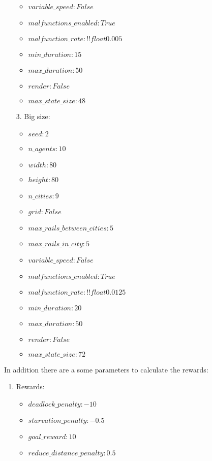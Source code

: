 \begin{enumerate}
\begin{itemize}
		\item  $variable\_speed: False $
		\item $malfunctions\_enabled: True $ 
		\item $malfunction\_rate: !!float 0.005 $
		\item $min\_duration: 15 $
		\item $max\_duration: 50 $
		\item $render: False$
		\item $max\_state\_size: 48$
	\end{itemize}
	\item [3.] Big size:
		\begin{itemize}
		\item $seed: 2$
		\item $n\_agents: 10 $
		\item $width: 80 $
		\item $height: 80 $
		\item $n\_cities: 9 $
		\item $grid: False $
		\item $max\_rails\_between\_cities: 5 $
		\item $max\_rails\_in\_city: 5 $
		\item  $variable\_speed: False $
		\item $malfunctions\_enabled: True $ 
		\item $malfunction\_rate: !!float 0.0125 $
		\item $min\_duration: 20 $
		\item $max\_duration: 50 $
		\item $render: False$
		\item $max\_state\_size: 72$
	\end{itemize}
\end{enumerate}
In addition there are a some parameters to calculate the rewards:
\begin{enumerate}
	\item Rewards:
	\begin{itemize}
		\item $deadlock\_penalty: -10$
		\item $starvation\_penalty: -0.5$
		\item $goal\_reward: 10$
		\item $reduce\_distance\_penalty: 0.5$
	\end{itemize}	
\end{enumerate}

